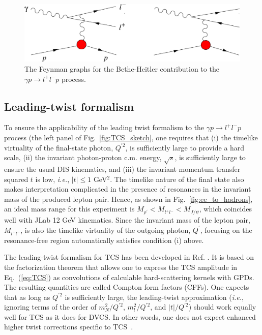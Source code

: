 \begin{figure}[t]
\begin{center}
\includegraphics[scale=0.52]{BH.eps}
\caption{\small{The Feynman graphs for the Bethe-Heitler contribution to the 
$\gamma p \to l^+ l^- p$ process.}}
\label{fig:BH}
\end{center}
\end{figure}


\subsection{Leading-twist formalism}
\label{subsec:leading_twist}

To ensure the applicability of the leading twist formalism to the
$\gamma p \to l^{+} l^{-}p$ process (the left panel of
Fig.~\ref{fig:TCS_sketch}, one requires that 
(i) the timelike virtuality of the final-state photon, $Q^{\prime 2}$,
is sufficiently large to provide a hard scale,
(ii) the invariant photon-proton c.m. energy, $\sqrt{s}$, is sufficiently
large to ensure the usual DIS kinematics, and
(iii) the invariant momentum transfer squared $t$ is low, \textit{i.e.},
$|t| \leq 1$ GeV$^2$. 
The timelike nature of the final state also makes interpretation complicated
in the presence of resonances in the invariant mass of the produced lepton
pair. Hence, as shown in Fig.~\ref{fig:ee_to_hadrons}, an ideal mass range for
this experiment is $M_{\rho^\prime} < M_{l^{+} l^{-}} < M_{J/\psi}$, which
coincides well with JLab 12 GeV kinematics.
Since the invariant mass of the lepton pair, $M_{l^{+} l^{-}}$, is also the
timelike virtuality of the outgoing photon, $Q^\prime$, focusing on the
resonance-free region automatically satisfies condition (i) above.

The leading-twist formalism for TCS has been developed in Ref.
\cite{Berger:2001xd}. It is based on the factorization theorem
\cite{Collins:1998be} that allows one to express the TCS amplitude in
Eq.~(\ref{eq:TCS}) as convolutions of calculable hard-scattering kernels
with GPDs. The resulting quantities are called Compton form factors (CFFs).
One expects that as long as $Q^{\prime 2}$ is sufficiently large, the
leading-twist approximation (\textit{i.e.}, ignoring terms of the order
of $m_N^2/Q^{\prime 2}$, $m_l^2/Q^{\prime 2}$, and $|t|/Q^{\prime 2}$)
should work equally well for TCS as it does for DVCS. In other words,
one does not expect enhanced higher twist corrections specific to
TCS~\cite{Diehl:2003ny}.

